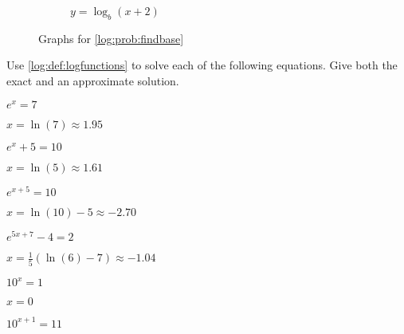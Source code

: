 \begin{exercises}
\begin{problem}
\begin{figure}[htb]
\begin{widepage}
\begin{subfigure}{.2\textwidth}
		\caption{$y=\log_b(x+2)$}
		\label{log:fig:findbase4}
	\end{subfigure}%
	\caption{Graphs for \cref{log:prob:findbase}}
	\label{log:fig:findbase}
	\end{widepage}
\end{figure} 
\end{problem}

\begin{problem}
Use \cref{log:def:logfunctions} to solve each of the following equations. Give both 
the exact and an approximate solution.
\begin{multicols}{4}
	\begin{subproblem}
		$e^x=7$ 
		\begin{shortsolution}
			$x=\ln(7)\approx 1.95$
		\end{shortsolution}
	\end{subproblem}
	\begin{subproblem}
		$e^x+5=10$ 
		\begin{shortsolution}
			$x=\ln(5)\approx 1.61$
		\end{shortsolution}
	\end{subproblem}
	\begin{subproblem}
		$e^{x+5}=10$  
		\begin{shortsolution}
			$x=\ln(10)-5\approx -2.70$
		\end{shortsolution}
	\end{subproblem}
	\begin{subproblem}
		$e^{5x+7}-4=2$ 
		\begin{shortsolution}
			$x=\frac{1}{5}(\ln(6)-7)\approx -1.04$
		\end{shortsolution}
	\end{subproblem}
	\begin{subproblem}
		$10^x=1$ 
		\begin{shortsolution}
			$x=0$
		\end{shortsolution}
	\end{subproblem}
	\begin{subproblem}
		$10^{x+1}=11$ 
		\begin{shortsolution}

\end{shortsolution}
\end{subproblem}
\end{multicols}
\end{problem}
\end{exercises}
